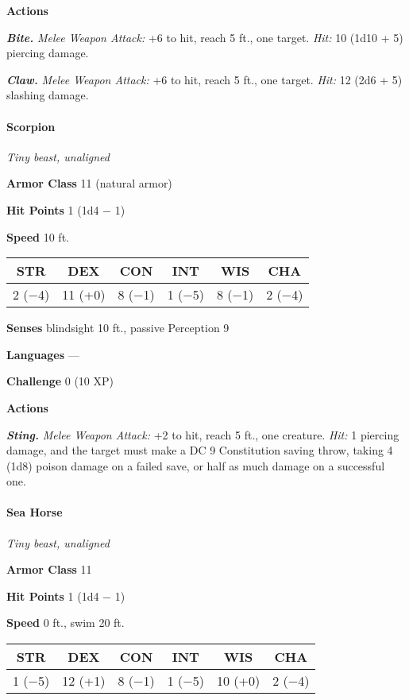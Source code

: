\documentclass[
]{article}
\begin{document}
\textbf{Actions}

\emph{\textbf{Bite.}} \emph{Melee Weapon Attack:} +6 to hit, reach 5
ft., one target. \emph{Hit:} 10 (1d10 + 5) piercing damage.

\emph{\textbf{Claw.}} \emph{Melee Weapon Attack:} +6 to hit, reach 5
ft., one target. \emph{Hit:} 12 (2d6 + 5) slashing damage.

\hypertarget{scorpion}{%
\paragraph{Scorpion}\label{scorpion}}

\emph{Tiny beast, unaligned}

\textbf{Armor Class} 11 (natural armor)

\textbf{Hit Points} 1 (1d4 − 1)

\textbf{Speed} 10 ft.

\begin{longtable}[]{@{}cccccc@{}}
\toprule
STR & DEX & CON & INT & WIS & CHA\tabularnewline
\midrule
\endhead
2 (−4) & 11 (+0) & 8 (−1) & 1 (−5) & 8 (−1) & 2 (−4)\tabularnewline
\bottomrule
\end{longtable}

\textbf{Senses} blindsight 10 ft., passive Perception 9

\textbf{Languages} ---

\textbf{Challenge} 0 (10 XP)

\textbf{Actions}

\emph{\textbf{Sting.}} \emph{Melee Weapon Attack:} +2 to hit, reach 5
ft., one creature. \emph{Hit:} 1 piercing damage, and the target must
make a DC 9 Constitution saving throw, taking 4 (1d8) poison damage on a
failed save, or half as much damage on a successful one.

\hypertarget{sea-horse}{%
\paragraph{Sea Horse}\label{sea-horse}}

\emph{Tiny beast, unaligned}

\textbf{Armor Class} 11

\textbf{Hit Points} 1 (1d4 − 1)

\textbf{Speed} 0 ft., swim 20 ft.

\begin{longtable}[]{@{}cccccc@{}}
\toprule
STR & DEX & CON & INT & WIS & CHA\tabularnewline
\midrule
\endhead
1 (−5) & 12 (+1) & 8 (−1) & 1 (−5) & 10 (+0) & 2 (−4)\tabularnewline
\bottomrule
\end{longtable}
\end{document}
